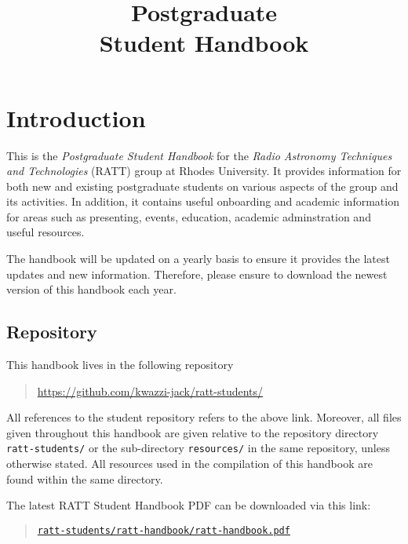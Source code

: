 \documentclass[12pt]{article}
\title{Postgraduate\\Student Handbook}
\author{}  %
\date{\the\year}
\begin{document}
\maketitle

\newpage

\section{Introduction}

    This is the \emph{Postgraduate Student Handbook} for the \emph{Radio Astronomy Techniques and Technologies} (RATT) group at Rhodes University. It provides information for both new and existing postgraduate students on various aspects of the group and its activities. In addition, it contains useful onboarding and academic information for areas such as presenting, events, education, academic adminstration and useful resources.

    The handbook will be updated on a yearly basis to ensure it provides the latest updates and new information. Therefore, please ensure to download the newest version of this handbook each year.

    \subsection{Repository}\label{subsec:repository}
        This handbook lives in the following repository

        \begin{quotation}
            \url{https://github.com/kwazzi-jack/ratt-students/}
        \end{quotation}

        All references to the student repository refers to the above link. Moreover, all files given throughout this handbook are given relative to the repository directory \texttt{ratt-students/} or the sub-directory \texttt{resources/} in the same repository, unless otherwise stated. All resources used in the compilation of this handbook are found within the same directory.

        The latest RATT Student Handbook PDF can be downloaded via this link:

        \begin{quotation}
            \hyperlink{https://github.com/kwazzi-jack/ratt-students/blob/main/ratt-handbook/ratt-handbook.pdf}{\texttt{ratt-students/ratt-handbook/ratt-handbook.pdf}}
        \end{quotation}
\end{document}
